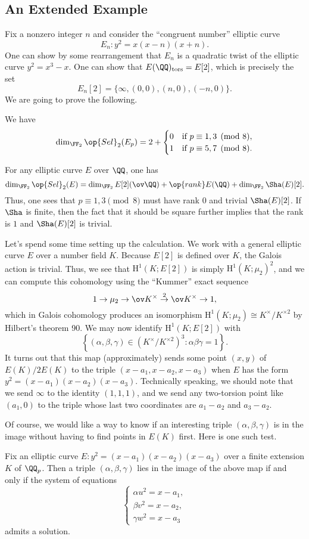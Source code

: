 \documentclass[../notes.tex]{subfiles}
\begin{document}
\subsection{An Extended Example}
Fix a nonzero integer $n$ and consider the ``congruent number'' elliptic curve
\[E_n\colon y^2=x(x-n)(x+n).\]
One can show by some rearrangement that $E_n$ is a quadratic twist of the elliptic curve $y^2=x^3-x$. One can show that $E(\QQ)_{\mathrm{tors}}=E[2]$, which is precisely the set
\[E_n[2]=\{\infty,(0,0),(n,0),(-n,0)\}.\]
We are going to prove the following.
\begin{theorem}
	We have
	\[\dim_{\FF_2}\op{Sel}_2(E_p)=2+\begin{cases}
		0 & \text{if }p\equiv1,3\pmod 8, \\
		1 & \text{if }p\equiv5,7\pmod 8.
	\end{cases}\]
\end{theorem}
\begin{example}
	For any elliptic curve $E$ over $\QQ$, one has
	\[\dim_{\FF_2}\op{Sel}_2(E)=\dim_{\FF_2}E[2](\ov\QQ)+\op{rank}E(\QQ)+\dim_{\FF_2}\Sha(E)[2].\]
	Thus, one sees that $p\equiv1,3\pmod8$ must have rank $0$ and trivial $\Sha(E)[2]$. If $\Sha$ is finite, then the fact that it should be square further implies that the rank is $1$ and $\Sha(E)[2]$ is trivial.
\end{example}
Let's spend some time setting up the calculation. We work with a general elliptic curve $E$ over a number field $K$. Because $E[2]$ is defined over $K$, the Galois action is trivial. Thus, we see that $\mathrm H^1(K;E[2])$ is simply $\mathrm H^1(K;\mu_2)^2$, and we can compute this cohomology using the ``Kummer'' exact sequence
\[1\to\mu_2\to\ov K^\times\stackrel2\to\ov K^\times\to1,\]
which in Galois cohomology produces an isomorphism $\mathrm H^1(K;\mu_2)\cong K^\times/K^{\times2}$ by Hilbert's theorem 90. We may now identify $\mathrm H^1(K;E[2])$ with
\[\left\{(\alpha,\beta,\gamma)\in(K^\times/K^{\times2})^3:\alpha\beta\gamma=1\right\}.\]
It turns out that this map (approximately) sends some point $(x,y)$ of $E(K)/2E(K)$ to the triple $(x-a_1,x-a_2,x-a_3)$ when $E$ has the form $y^2=(x-a_1)(x-a_2)(x-a_3)$. Technically speaking, we should note that we send $\infty$ to the identity $(1,1,1)$, and we send any two-torsion point like $(a_1,0)$ to the triple whose last two coordinates are $a_1-a_2$ and $a_3-a_2$.

Of course, we would like a way to know if an interesting triple $(\alpha,\beta,\gamma)$ is in the image without having to find points in $E(K)$ first. Here is one such test.
\begin{lemma}
	Fix an elliptic curve $E\colon y^2=(x-a_1)(x-a_2)(x-a_3)$ over a finite extension $K$ of $\QQ_p$. Then a triple $(\alpha,\beta,\gamma)$ lies in the image of the above map if and only if the system of equations
	\[\begin{cases}
		\alpha u^2=x-a_1, \\
		\beta v^2=x-a_2, \\
		\gamma w^2=x-a_3
	\end{cases}\]
	admits a solution.
\end{lemma}
\end{document}

